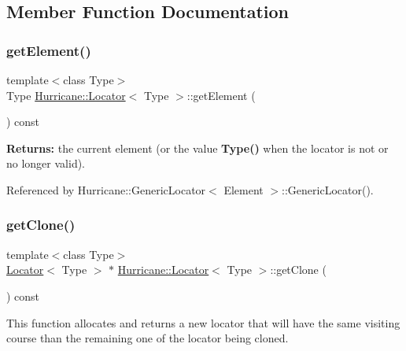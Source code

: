 \subsection{Member Function Documentation}
\mbox{\label{classHurricane_1_1Locator_aa2202b4cf461a7c3b666da10bc96219f}} 
\subsubsection{\texorpdfstring{get\+Element()}{getElement()}}
{\footnotesize\ttfamily template$<$class Type$>$ \\
Type \hyperlink{classHurricane_1_1Locator}{Hurricane\+::\+Locator}$<$ Type $>$\+::get\+Element (\begin{DoxyParamCaption}{ }\end{DoxyParamCaption}) const\hspace{0.3cm}{\ttfamily [pure virtual]}}

{\bfseries Returns\+:} the current element (or the value {\bfseries Type()} when the locator is not or no longer valid). 

Referenced by Hurricane\+::\+Generic\+Locator$<$ Element $>$\+::\+Generic\+Locator().

\mbox{\label{classHurricane_1_1Locator_a83779aa300e3de011bf3b93be8a48d83}} 
\subsubsection{\texorpdfstring{get\+Clone()}{getClone()}}
{\footnotesize\ttfamily template$<$class Type$>$ \\
\hyperlink{classHurricane_1_1Locator}{Locator}$<$ Type $>$ $\ast$ \hyperlink{classHurricane_1_1Locator}{Hurricane\+::\+Locator}$<$ Type $>$\+::get\+Clone (\begin{DoxyParamCaption}{ }\end{DoxyParamCaption}) const\hspace{0.3cm}{\ttfamily [pure virtual]}}

This function allocates and returns a new locator that will have the same visiting course than the remaining one of the locator being cloned.

